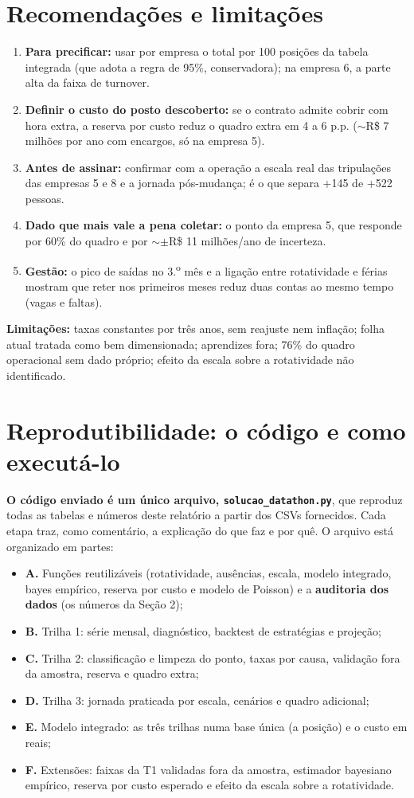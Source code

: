 \documentclass[11pt,a4paper]{article}
\begin{document}
\section{Recomendações e limitações}
\begin{enumerate}
\item \textbf{Para precificar:} usar por empresa o total por 100 posições da tabela integrada (que adota a regra de 95\%, conservadora); na empresa 6, a parte alta da faixa de turnover.
\item \textbf{Definir o custo do posto descoberto:} se o contrato admite cobrir com hora extra, a reserva por custo reduz o quadro extra em 4 a 6 p.p. ($\sim$R\$ 7 milhões por ano com encargos, só na empresa 5).
\item \textbf{Antes de assinar:} confirmar com a operação a escala real das tripulações das empresas 5 e 8 e a jornada pós-mudança; é o que separa +145 de +522 pessoas.
\item \textbf{Dado que mais vale a pena coletar:} o ponto da empresa 5, que responde por 60\% do quadro e por $\sim\pm$R\$ 11 milhões/ano de incerteza.
\item \textbf{Gestão:} o pico de saídas no 3.\textsuperscript{o} mês e a ligação entre rotatividade e férias mostram que reter nos primeiros meses reduz duas contas ao mesmo tempo (vagas e faltas).
\end{enumerate}
\textbf{Limitações:} taxas constantes por três anos, sem reajuste nem inflação; folha atual tratada como bem dimensionada; aprendizes fora; 76\% do quadro operacional sem dado próprio; efeito da escala sobre a rotatividade não identificado.

\section*{Reprodutibilidade: o código e como executá-lo}
\textbf{O código enviado é um único arquivo, \texttt{solucao\_datathon.py}}, que reproduz todas as tabelas e números deste relatório a partir dos CSVs fornecidos. Cada etapa traz, como comentário, a explicação do que faz e por quê. O arquivo está organizado em partes:
\begin{itemize}
\item \textbf{A.} Funções reutilizáveis (rotatividade, ausências, escala, modelo integrado, bayes empírico, reserva por custo e modelo de Poisson) e a \textbf{auditoria dos dados} (os números da Seção 2);
\item \textbf{B.} Trilha 1: série mensal, diagnóstico, backtest de estratégias e projeção;
\item \textbf{C.} Trilha 2: classificação e limpeza do ponto, taxas por causa, validação fora da amostra, reserva e quadro extra;
\item \textbf{D.} Trilha 3: jornada praticada por escala, cenários e quadro adicional;
\item \textbf{E.} Modelo integrado: as três trilhas numa base única (a posição) e o custo em reais;
\item \textbf{F.} Extensões: faixas da T1 validadas fora da amostra, estimador bayesiano empírico, reserva por custo esperado e efeito da escala sobre a rotatividade.
\end{itemize}
\end{document}
